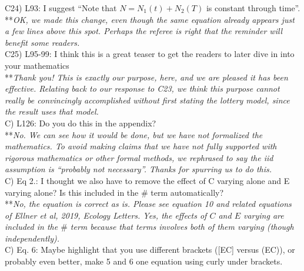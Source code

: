 \documentclass[letterpaper,11pt]{article}
\begin{document}
\noindent C24) L93: I suggest ``Note that $N = N_1(t) + N_2(T)$ is constant through time''. \\

\noindent ***\emph{OK, we made this change, even though the same equation already appears just a few lines
above this spot. Perhaps the referee is right that the reminder will benefit some readers.} \\

\noindent C25) L95-99: I think this is a great teaser to get the readers to later dive in into your mathematics \\

\noindent ***\emph{Thank you! This is exactly our purpose, here, and we are pleased it has been effective.
Relating back to our response to C23, we think this purpose cannot really be convincingly accomplished
without first stating the lottery model, since the result uses that model. } \\

\noindent C) L126: Do you do this in the appendix? \\

\noindent ***\emph{No. We can see how it would be done, but we have not formalized the mathematics. 
To avoid making claims that we have not fully supported
with rigorous mathematics or other formal methods, we rephrased to say the iid assumption is 
``probably not necessary''. Thanks for spurring us to do this.} \\

\noindent C) Eq 2.: I thought we also have to remove the effect of C varying alone and E varying alone? Is this included in the $\#$ term automatically? \\

\noindent ***\emph{No, the equation is correct as is. Please see equation 10 and related equations of 
Ellner et al, 2019, Ecology Letters. Yes, the effects of $C$ and $E$ varying are included in 
the $\#$ term because that terms involves both of them varying (though independently).} \\

\noindent C) Eq. 6: Maybe highlight that you use different brackets ([EC] versus (EC)), or probably even better, make 5 and 6 one equation using curly under brackets. \\
\end{document}
